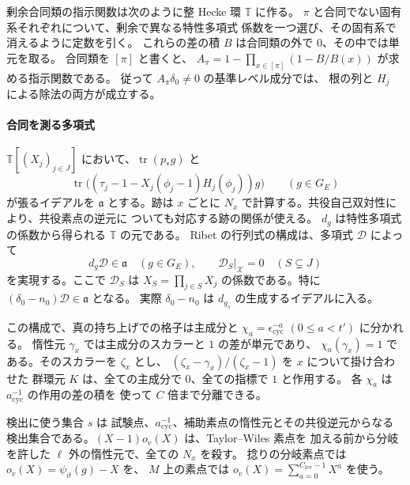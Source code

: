 剰余合同類の指示関数は次のように整 Hecke 環 \(\mathbb T\) に作る。
\(\pi\) と合同でない固有系それぞれについて、剰余で異なる特性多項式
係数を一つ選び、その固有系で消えるように定数を引く。
これらの差の積 \(B\) は合同類の外で \(0\)、その中では単元を取る。
合同類を \([\pi]\) と書くと、
\(A_\pi=1-\prod_{x\in[\pi]}(1-B/B(x))\) が求める指示関数である。
従って \(A_\pi\delta_0\ne0\) の基準レベル成分では、
根の列と \(H_j\) による除法の両方が成立する。

\paragraph{合同を測る多項式}
\(\mathbb T[(X_j)_{j\in J}]\) において、\(\operatorname{tr}(p_\ast g)\) と
\[
 \operatorname{tr}\bigl((\tau_j-1-
         X_j(\phi_j-1)H_j(\phi_j))g\bigr)\qquad (g\in G_E)
\]
が張るイデアルを \(\mathfrak a\) とする。跡は \(x\) ごとに
\(N_x\) で計算する。共役自己双対性により、共役素点の逆元に
ついても対応する跡の関係が使える。
\(d_g\) は特性多項式の係数から得られる \(\mathbb T\) の元である。
Ribet の行列式の構成は、多項式 \(\mathcal D\) によって
\[
 d_g\mathcal D\in\mathfrak a\quad(g\in G_E),\qquad
 \mathcal D_S\big|_{\mathcal X}=0\quad(S\subsetneq J)
\]
を実現する。ここで \(\mathcal D_S\) は \(X_S=\prod_{j\in S}X_j\)
の係数である。特に \((\delta_0-n_0)\mathcal D\in\mathfrak a\) となる。
実際 \(\delta_0-n_0\) は \(d_{g_s}\) の生成するイデアルに入る。

この構成で、真の持ち上げでの格子は主成分と
\(\chi_a=\epsilon_{\mathrm{cyc}}^{-a}\) \((0\le a<t')\) に分かれる。
惰性元 \(\gamma_x\) では主成分のスカラーと \(1\) の差が単元であり、
\(\chi_a(\gamma_x)=1\) である。そのスカラーを \(\zeta_x\) とし、
\((\zeta_x-\gamma_x)/(\zeta_x-1)\) を \(x\) について掛け合わせた
群環元 \(K\) は、全ての主成分で \(0\)、全ての指標で \(1\) と作用する。
各 \(\chi_a\) は \(a_{\mathrm{cyc}}^{-1}\) の作用の差の積を
使って \(C\) 倍まで分離できる。

検出に使う集合 \(s\) は
試験点、\(a_{\mathrm{cyc}}^{-1}\)、補助素点の惰性元とその共役逆元からなる
検出集合である。\((X-1)o_v(X)\) は、Taylor--Wiles 素点を
加える前から分岐を許した \(\ell\) 外の惰性元で、全ての \(N_x\) を殺す。
捻りの分岐素点では \(o_v(X)=\psi_\vartheta(g)-X\) を、
\(M\) 上の素点では \(o_v(X)=\sum_{a=0}^{C_{\mathrm{lev}}-1}X^a\) を使う。

